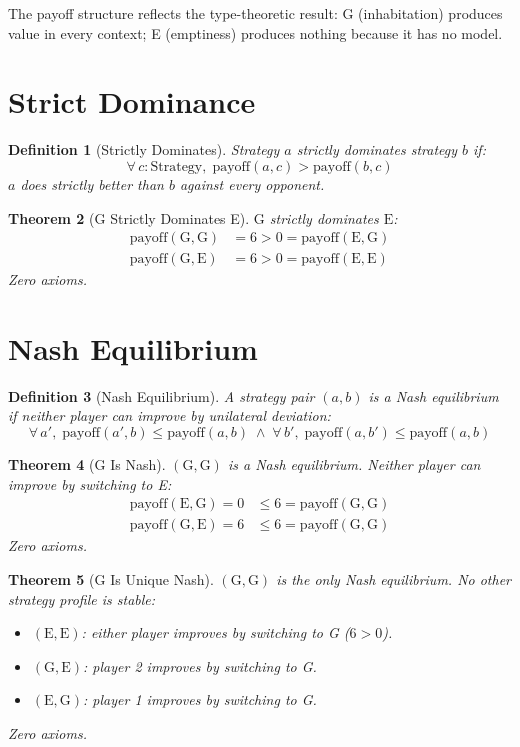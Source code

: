 \documentclass[12pt,a4paper]{article}
\newtheorem{theorem}{Theorem}[section]
\newtheorem{definition}[theorem]{Definition}
\begin{document}
The payoff structure reflects the type-theoretic result: G (inhabitation)
produces value in every context; E (emptiness) produces nothing because
it has no model.

\section{Strict Dominance}

\begin{definition}[Strictly Dominates]
Strategy $a$ strictly dominates strategy $b$ if:
\[
\forall\, c : \text{Strategy},\; \text{payoff}(a, c) > \text{payoff}(b, c)
\]
$a$ does strictly better than $b$ against every opponent.
\end{definition}

\begin{theorem}[G Strictly Dominates E]\label{thm:dom}
$\text{G}$ strictly dominates $\text{E}$:
\begin{align*}
\text{payoff}(\text{G}, \text{G}) &= 6 > 0 = \text{payoff}(\text{E}, \text{G}) \\
\text{payoff}(\text{G}, \text{E}) &= 6 > 0 = \text{payoff}(\text{E}, \text{E})
\end{align*}
Zero axioms.
\end{theorem}

\section{Nash Equilibrium}

\begin{definition}[Nash Equilibrium]
A strategy pair $(a, b)$ is a Nash equilibrium if neither player can
improve by unilateral deviation:
\[
\forall\, a',\; \text{payoff}(a', b) \leq \text{payoff}(a, b)
\;\wedge\;
\forall\, b',\; \text{payoff}(a, b') \leq \text{payoff}(a, b)
\]
\end{definition}

\begin{theorem}[G Is Nash]\label{thm:nash}
$(\text{G}, \text{G})$ is a Nash equilibrium. Neither player can improve
by switching to E:
\begin{align*}
\text{payoff}(\text{E}, \text{G}) = 0 &\leq 6 = \text{payoff}(\text{G}, \text{G}) \\
\text{payoff}(\text{G}, \text{E}) = 6 &\leq 6 = \text{payoff}(\text{G}, \text{G})
\end{align*}
Zero axioms.
\end{theorem}

\begin{theorem}[G Is Unique Nash]\label{thm:unique}
$(\text{G}, \text{G})$ is the \emph{only} Nash equilibrium. No other
strategy profile is stable:
\begin{itemize}
    \item $(\text{E}, \text{E})$: either player improves by switching to G
    ($6 > 0$).
    \item $(\text{G}, \text{E})$: player 2 improves by switching to G.
    \item $(\text{E}, \text{G})$: player 1 improves by switching to G.
\end{itemize}
Zero axioms.
\end{theorem}
\end{document}
